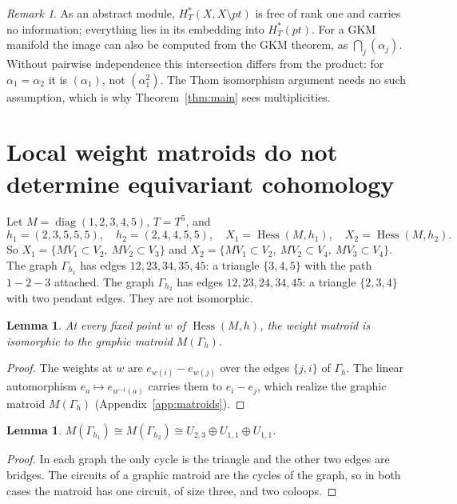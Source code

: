 \documentclass[11pt,a4paper]{article}
\numberwithin{equation}{section}
\theoremstyle{plain}
\newtheorem{lemma}[theorem]{Lemma}
\theoremstyle{definition}
\theoremstyle{remark}
\newtheorem{remark}[theorem]{Remark}
\newcommand{\HT}{H^{*}_{T}}
\DeclareMathOperator{\Hess}{Hess}
\DeclareMathOperator{\diag}{diag}
\begin{document}
\begin{remark}
As an abstract module, $\HT(X,X\setminus pt)$ is free of rank one and carries no information; everything lies in its embedding into $\HT(pt)$. For a GKM manifold the image can also be computed from the GKM theorem, as $\bigcap_j(\alpha_j)$. Without pairwise independence this intersection differs from the product: for $\alpha_1=\alpha_2$ it is $(\alpha_1)$, not $(\alpha_1^2)$. The Thom isomorphism argument needs no such assumption, which is why Theorem~\ref{thm:main} sees multiplicities.
\end{remark}

\section{Local weight matroids do not determine equivariant cohomology}\label{sec:counterexample}

Let $M=\diag(1,2,3,4,5)$, $T=T^5$, and
\[
h_1=(2,3,5,5,5),\quad h_2=(2,4,4,5,5),\quad X_1=\Hess(M,h_1),\quad X_2=\Hess(M,h_2).
\]
So $X_1=\{MV_1\subset V_2,\ MV_2\subset V_3\}$ and $X_2=\{MV_1\subset V_2,\ MV_2\subset V_4,\ MV_3\subset V_4\}$. The graph $\Gamma_{h_1}$ has edges $12,23,34,35,45$: a triangle $\{3,4,5\}$ with the path $1-2-3$ attached. The graph $\Gamma_{h_2}$ has edges $12,23,24,34,45$: a triangle $\{2,3,4\}$ with two pendant edges. They are not isomorphic.

\begin{lemma}\label{lem:local-hess}
At every fixed point $w$ of $\Hess(M,h)$, the weight matroid is isomorphic to the graphic matroid $M(\Gamma_h)$.
\end{lemma}

\begin{proof}
The weights at $w$ are $e_{w(i)}-e_{w(j)}$ over the edges $\{j,i\}$ of $\Gamma_h$. The linear automorphism $e_a\mapsto e_{w^{-1}(a)}$ carries them to $e_i-e_j$, which realize the graphic matroid $M(\Gamma_h)$ (Appendix~\ref{app:matroids}).
\end{proof}

\begin{lemma}\label{lem:iso-matroids}
$M(\Gamma_{h_1})\cong M(\Gamma_{h_2})\cong U_{2,3}\oplus U_{1,1}\oplus U_{1,1}$.
\end{lemma}

\begin{proof}
In each graph the only cycle is the triangle and the other two edges are bridges. The circuits of a graphic matroid are the cycles of the graph, so in both cases the matroid has one circuit, of size three, and two coloops.
\end{proof}
\end{document}
